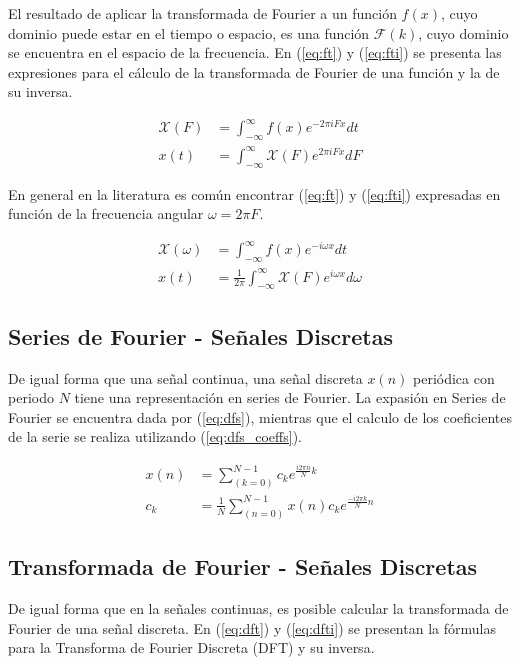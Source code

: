 \documentclass[
  letterpaper,
  twocolumn,
  9pt,
  journal,
  final]{IEEEtran}
\begin{document}
El resultado de aplicar la transformada de Fourier a un función $f(x)$, cuyo dominio puede estar en el tiempo o espacio, es una función $\mathcal{F}(k)$, cuyo dominio se encuentra en el espacio de la frecuencia. En (\ref{eq:ft}) y (\ref{eq:fti}) se presenta las expresiones para el cálculo de la transformada de Fourier de una función y la de su inversa.

\begin{align}
	\mathcal{X}(F) &= \int_{-\infty}^{\infty} f(x) e^{-2\pi i F x} dt \label{eq:ft}\\
	x(t) &= \int_{-\infty}^{\infty} \mathcal{X}(F) e^{ 2\pi i F x} dF \label{eq:fti}
\end{align}

En general en la literatura es común encontrar (\ref{eq:ft}) y (\ref{eq:fti}) expresadas en función de la frecuencia angular $\omega = 2\pi F$.

\begin{align}
	\mathcal{X}(\omega) &= \int_{-\infty}^{\infty} f(x) e^{-i \omega x} dt \label{eq:ft}\\
	x(t) &= \frac{1}{2\pi} \int_{-\infty}^{\infty} \mathcal{X}(F) e^{i \omega x} d\omega \label{eq:fti}
\end{align}

\subsection{Series de Fourier - Señales Discretas}

De igual forma que una señal continua, una señal discreta $x(n)$ periódica con periodo $N$ tiene una representación en series de Fourier. La expasión en Series de Fourier se encuentra dada por (\ref{eq:dfs}), mientras que el calculo de los coeficientes de la serie se realiza utilizando (\ref{eq:dfs_coeffs}).

\begin{align}
	x(n) &= \sum_(k=0)^{N-1} c_k e^{\frac{i 2 \pi n}{N} k } \label{eq:dfs} \\
	c_k &= \frac{1}{N} \sum_(n=0)^{N-1} x(n) c_k e^{\frac{-i 2 \pi k}{N} n} \label{eq:dfs_coeffs}
\end{align}


\subsection{Transformada de Fourier - Señales Discretas}

De igual forma que en la señales continuas, es posible calcular la transformada de Fourier de una señal discreta. En (\ref{eq:dft}) y (\ref{eq:dfti}) se presentan la fórmulas para la Transforma de Fourier Discreta (DFT) y su inversa.
\end{document}
